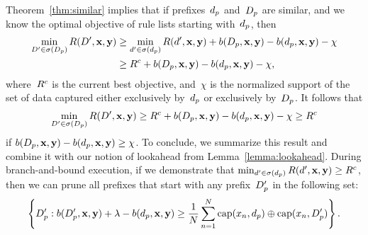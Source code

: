 Theorem~\ref{thm:similar} implies that if prefixes~$d_p$
and~$D_p$ are similar, and we know the optimal objective
of rule lists starting with~$d_p$, then
\begin{align}
\min_{\RLB' \in \StartsWith(\PrefixB)} \Obj(\RLB', \x, \y)
&\ge \min_{\RL' \in \StartsWith(\Prefix)} \Obj(\RL', \x, \y)
+ b(\PrefixB, \x, \y) - b(\Prefix, \x, \y) - \chi \nn \\
&\ge \CurrentObj + b(\PrefixB, \x, \y) - b(\Prefix, \x, \y) - \chi,
\end{align}
where~${R^c}$ is the current best objective,
and~$\chi$ is the normalized support of the set of data captured
either exclusively by~$d_p$ or exclusively by~$D_p$.
%
It follows that
\begin{align}
\min_{\RLB' \in \StartsWith(\PrefixB)} \Obj(\RLB', \x, \y)
\ge \CurrentObj + b(\PrefixB, \x, \y) - b(\Prefix, \x, \y) - \chi \ge \CurrentObj
\end{align}
if ${b(D_p, \mathbf{x}, \mathbf{y}) - b(d_p, \mathbf{x}, \mathbf{y}) \ge \chi}$.
%
To conclude, we summarize this result and combine it with
our notion of lookahead from Lemma~\ref{lemma:lookahead}.
%
During branch-and-bound execution, if we demonstrate that
${\min_{{d}' \in \sigma(d_p)} R({d}', \mathbf{x}, \mathbf{y}) \ge {R^c}}$,
then we can prune all prefixes that start with any
prefix~$D_p'$ in the following set:
\begin{align}
\left\{ \PrefixB' : b(\PrefixB', \x, \y) + \Reg - b(\Prefix, \x, \y) \ge
\frac{1}{N} \sum_{n=1}^N \Cap(x_n, \Prefix) \oplus \Cap(x_n, \PrefixB') \right\}.
\end{align}


